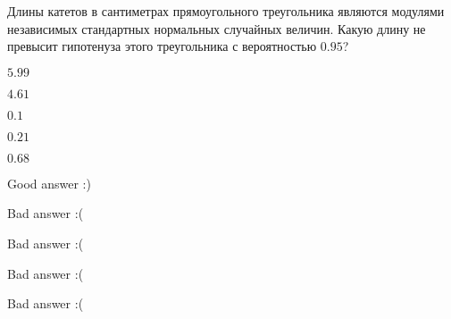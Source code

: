 
\begin{question}
Длины катетов в сантиметрах прямоугольного треугольника являются
модулями независимых стандартных нормальных случайных величин. Какую
длину не превысит гипотенуза этого треугольника с вероятностью \(0.95\)?
\begin{answerlist}
  \item \(5.99\)
  \item \(4.61\)
  \item \(0.1\)
  \item \(0.21\)
  \item \(0.68\)
\end{answerlist}
\end{question}

\begin{solution}
\begin{answerlist}
  \item Good answer :)
  \item Bad answer :(
  \item Bad answer :(
  \item Bad answer :(
  \item Bad answer :(
\end{answerlist}
\end{solution}

